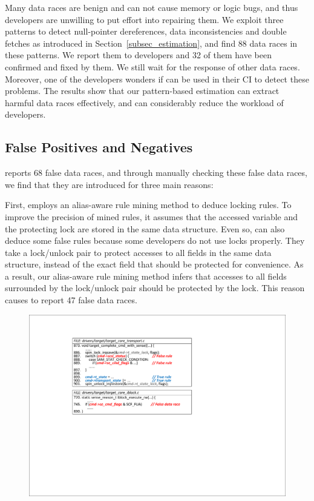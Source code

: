  Many data races are benign and can not cause memory 
or logic bugs, and thus developers are unwilling to put effort into repairing 
them. We exploit three patterns to detect null-pointer dereferences, data 
inconsistencies and double fetches as introduced in 
Section~\ref{subsec_estimation}, and find 88 data races in these patterns. We 
report them to developers and 32 of them have been confirmed and fixed by them. 
We still wait for the response of other data races. Moreover, one of the 
developers wonders if \sys can be used in their CI to detect these problems. 
The results show that our pattern-based estimation can extract harmful data 
races effectively, and can considerably reduce the workload of developers.

\subsection{False Positives and Negatives}
\label{subsec_false_pos_neg}
 \sys reports 68 false data races, and through manually 
checking these false data races, we find that they are introduced for three 
main reasons:

First, \sys employs an alias-aware rule mining method to deduce locking rules. 
To improve the precision of mined rules, it assumes that the accessed variable 
and the protecting lock are stored in the same data structure. Even so, \sys 
can also deduce some false rules because some developers do not use locks 
properly. They take a lock/unlock pair to protect accesses to all fields in the 
same data structure, instead of the exact field that should be protected for 
convenience. As a result, our alias-aware rule mining method infers that 
accesses to all fields surrounded by the lock/unlock pair should be protected 
by the lock. This reason causes \sys to report 47 false data races.

\begin{figure}[htbp]
	\centering
	\includegraphics[width=1\linewidth]{figures/fig_demo_false_rule.pdf}
	\label{fig_demo_false_rule}
\end{figure}

